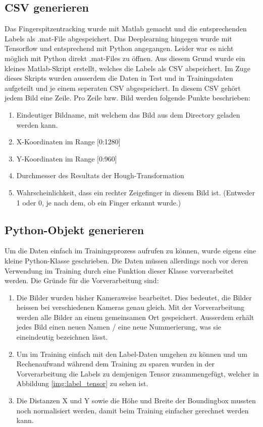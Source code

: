 \subsection{CSV generieren}
Das Fingerspitzentracking wurde mit Matlab gemacht und die entsprechenden Labels als .mat-File abgespeichert.
Das Deeplearning hingegen wurde mit Tensorflow und entsprechend mit Python angegangen. 
Leider war es nicht möglich mit Python direkt .mat-Files zu öffnen. 
Aus diesem Grund wurde ein kleines Matlab-Skript erstellt, welches die Labels als CSV abspeichert. 
Im Zuge dieses Skripts wurden ausserdem die Daten in Test und in Trainingsdaten aufgeteilt und je einem seperaten CSV abgespeichert.
In diesem CSV gehört jedem Bild eine Zeile. 
Pro Zeile bzw. Bild werden folgende Punkte beschrieben:
\begin{enumerate}
\item Eindeutiger Bildname, mit welchem das Bild aus dem Directory geladen werden kann. 
\item X-Koordinaten im Range [0:1280]
\item Y-Koordinaten im Range [0:960]
\item Durchmesser des Resultats der Hough-Transformation
\item Wahrscheinlichkeit, dass ein rechter Zeigefinger in diesem Bild ist. 
(Entweder 1 oder 0, je nach dem, ob ein Finger erkannt wurde.)
\end{enumerate}


\subsection{Python-Objekt generieren}
Um die Daten einfach im Trainingsprozess aufrufen zu können, wurde eigens eine kleine Python-Klasse geschrieben.
Die Daten müssen allerdings noch vor deren Verwendung im Training durch eine Funktion dieser Klasse vorverarbeitet werden.
Die Gründe für die Vorverarbeitung sind: 
\begin{enumerate}
\item Die Bilder wurden bisher Kameraweise bearbeitet.
Dies bedeutet, die Bilder heissen bei verschiedenen Kameras genau gleich.
Mit der Vorverarbeitung werden alle Bilder an einem gemeinsamen Ort gespeichert.
Ausserdem erhält jedes Bild einen neuen Namen / eine neue Nummerierung, was sie eineindeutig bezeichnen lässt.
\item Um im Training einfach mit den Label-Daten umgehen zu können und um Rechenaufwand während dem Training zu sparen wurden in der Vorverarbeitung die Labels zu demjenigen Tensor zusammengefügt, welcher in Abbildung \ref{img:label_tensor} zu sehen ist.
\item Die Distanzen X und Y sowie die Höhe und Breite der Boundingbox mussten noch normalisiert werden, damit beim Training einfacher gerechnet werden kann.
\end{enumerate}
